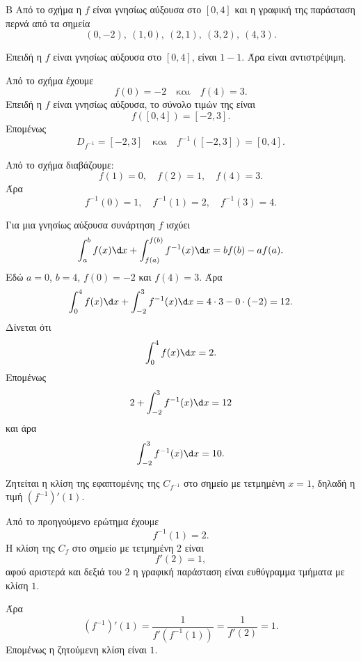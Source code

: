 \begin{thema}{Β}
Από το σχήμα η $f$ είναι γνησίως αύξουσα στο $[0,4]$ και η γραφική της παράσταση περνά από τα σημεία
\[
(0,-2),\ (1,0),\ (2,1),\ (3,2),\ (4,3).
\]

\begin{erwthma}
\item Επειδή η $f$ είναι γνησίως αύξουσα στο $[0,4]$, είναι $1-1$. Άρα είναι αντιστρέψιμη.

Από το σχήμα έχουμε
\[
f(0)=-2
\quad\text{και}\quad
f(4)=3.
\]
Επειδή η $f$ είναι γνησίως αύξουσα, το σύνολο τιμών της είναι
\[
f([0,4])=[-2,3].
\]
Επομένως
\[
D_{f^{-1}}=[-2,3]
\quad\text{και}\quad
f^{-1}([-2,3])=[0,4].
\]

\item Από το σχήμα διαβάζουμε:
\[
f(1)=0,\quad f(2)=1,\quad f(4)=3.
\]
Άρα
\[
f^{-1}(0)=1,\quad f^{-1}(1)=2,\quad f^{-1}(3)=4.
\]

\item Για μια γνησίως αύξουσα συνάρτηση $f$ ισχύει
\[
\dint_a^b f(x)\d x+\dint_{f(a)}^{f(b)} f^{-1}(x)\d x
=b f(b)-a f(a).
\]
Εδώ $a=0$, $b=4$, $f(0)=-2$ και $f(4)=3$. Άρα
\[
\dint_0^4 f(x)\d x+\dint_{-2}^{3} f^{-1}(x)\d x
=4\cdot 3-0\cdot(-2)=12.
\]
Δίνεται ότι
\[
\dint_0^4 f(x)\d x=2.
\]
Επομένως
\[
2+\dint_{-2}^{3} f^{-1}(x)\d x=12
\]
και άρα
\[
\dint_{-2}^{3} f^{-1}(x)\d x=10.
\]

\item Ζητείται η κλίση της εφαπτομένης της $C_{f^{-1}}$ στο σημείο με τετμημένη $x=1$, δηλαδή η τιμή $(f^{-1})'(1)$.

Από το προηγούμενο ερώτημα έχουμε
\[
f^{-1}(1)=2.
\]
Η κλίση της $C_f$ στο σημείο με τετμημένη $2$ είναι
\[
f'(2)=1,
\]
αφού αριστερά και δεξιά του $2$ η γραφική παράσταση είναι ευθύγραμμα τμήματα με κλίση $1$.

Άρα
\[
(f^{-1})'(1)=\frac{1}{f'(f^{-1}(1))}
=\frac{1}{f'(2)}
=1.
\]
Επομένως η ζητούμενη κλίση είναι $1$.
\end{erwthma}
\end{thema}



